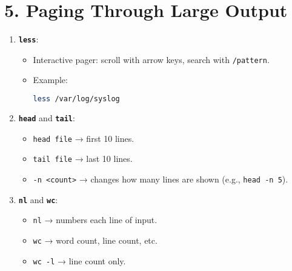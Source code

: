 \documentclass[a4paper]{report}
\begin{document}
\section*{5. Paging Through Large Output}
\begin{enumerate}
    \item \textbf{\texttt{less}}:
    \begin{itemize}
        \item Interactive pager: scroll with arrow keys, search with \texttt{/pattern}.
        \item Example:
        \begin{lstlisting}[language=bash]
less /var/log/syslog
        \end{lstlisting}
    \end{itemize}
    \item \textbf{\texttt{head}} and \textbf{\texttt{tail}}:
    \begin{itemize}
        \item \texttt{head file} → first 10 lines.
        \item \texttt{tail file} → last 10 lines.
        \item \texttt{-n <count>} → changes how many lines are shown (e.g., \texttt{head -n 5}).
    \end{itemize}
    \item \textbf{\texttt{nl}} and \textbf{\texttt{wc}}:
    \begin{itemize}
        \item \texttt{nl} → numbers each line of input.
        \item \texttt{wc} → word count, line count, etc.
        \item \texttt{wc -l} → line count only.
    \end{itemize}
\end{enumerate}
\end{document}
